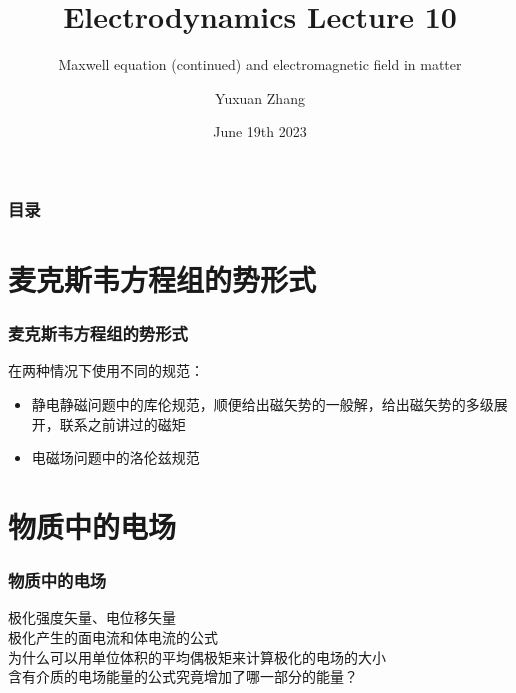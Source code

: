 \documentclass[10pt]{beamer}
\title[About Beamer] %
{Electrodynamics Lecture 10}
\subtitle{ Maxwell equation (continued) and electromagnetic field in matter }
\author %
{Yuxuan Zhang }
\institute[VFU] %
{
  School of Physics \quad
  Zhejiang University
}
\date[VLC 2021] %
{June 19th 2023}
\begin{document}
\frame{\titlepage}

\begin{frame}
    \frametitle{目录}
    \tableofcontents
\end{frame}


\section{麦克斯韦方程组的势形式}
\begin{frame}
    \frametitle{麦克斯韦方程组的势形式}
    在两种情况下使用不同的规范：
    \begin{itemize}
        \item 静电静磁问题中的库伦规范，顺便给出磁矢势的一般解，给出磁矢势的多级展开，联系之前讲过的磁矩
        \item 电磁场问题中的洛伦兹规范
    \end{itemize}
\end{frame}

\section{物质中的电场}
\begin{frame}
    \frametitle{物质中的电场}
    极化强度矢量、电位移矢量\\
    极化产生的面电流和体电流的公式\\
    为什么可以用单位体积的平均偶极矩来计算极化的电场的大小\\
    含有介质的电场能量的公式究竟增加了哪一部分的能量？
\end{frame}
\end{document}
